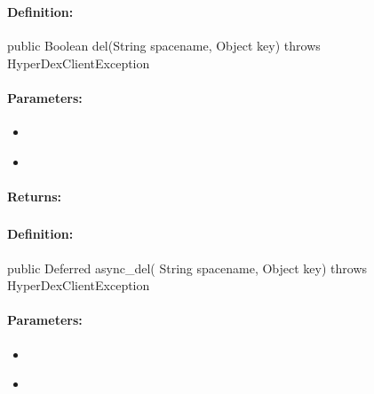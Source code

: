 \pagebreak
\subsubsection{}
\label{api:java:del}


\paragraph{Definition:}
\begin{javacode}
public Boolean del(String spacename, Object key) throws HyperDexClientException
\end{javacode}

\paragraph{Parameters:}
\begin{itemize}[noitemsep]
\item {}\\

\item {}\\

\end{itemize}

\paragraph{Returns:}


\pagebreak
\subsubsection{}
\label{api:java:async_del}


\paragraph{Definition:}
\begin{javacode}
public Deferred async_del(
        String spacename,
        Object key) throws HyperDexClientException
\end{javacode}

\paragraph{Parameters:}
\begin{itemize}[noitemsep]
\item {}\\

\item {}\\

\end{itemize}

